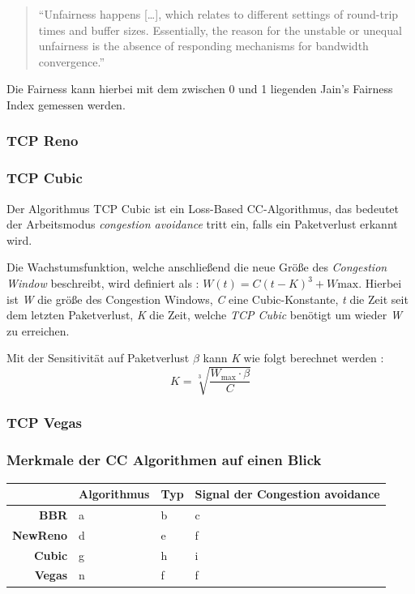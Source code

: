 \documentclass[paper=a4,fontsize=12pt,ngerman]{scrartcl}
\begin{document}

\begin{quote}
``Unfairness happens [\dots], which relates to different settings of round-trip times and buffer sizes.
Essentially, the reason for the unstable or unequal unfairness is the absence of responding mechanisms for bandwidth convergence.''\cite{tang24BBRns3}
\end{quote}
 

Die Fairness kann hierbei mit dem zwischen 0 und 1 liegenden Jain's Fairness Index gemessen werden.\cite{DBLP:journals/corr/cs-NI-9809099}

\subsubsection{TCP Reno}

\subsubsection{TCP Cubic}
Der Algorithmus TCP Cubic ist ein Loss-Based CC-Algorithmus, das bedeutet der
Arbeitsmodus \textit{congestion avoidance} tritt ein, falls ein Paketverlust erkannt wird.

Die Wachstumsfunktion, welche anschließend die neue Größe des \textit{Congestion Window}
beschreibt, wird definiert als : $ W(t) = C(t-K)^3 + W\text{max}.$  
Hierbei ist \textit{W} die größe des Congestion Windows, \textit{C} eine Cubic-Konstante, 
\textit{t} die Zeit seit dem letzten Paketverlust, \textit{K} die Zeit, welche \textit{TCP Cubic} benötigt 
um wieder \textit{W} zu erreichen.

Mit der Sensitivität auf Paketverlust $\beta$ kann \textit{K} wie folgt berechnet werden :
\[
K = \sqrt[3]{\frac{W_{\text{max}} \cdot \beta}{C}}
\]



\subsubsection{TCP Vegas}

\clearpage

\subsubsection{Merkmale der CC Algorithmen auf einen Blick}

\begin{table}[ht]
\centering

\begin{tabular}{r|l|l|l}
   & \textbf{Algorithmus} & \textbf{Typ} & \textbf{Signal der Congestion avoidance} \\ \hline
\textbf{BBR} & a & b & c \\
\textbf{NewReno} & d & e & f \\
\textbf{Cubic} & g & h & i \\
\textbf{Vegas} & n & f & f 

\end{tabular}
\end{table}
\end{document}
